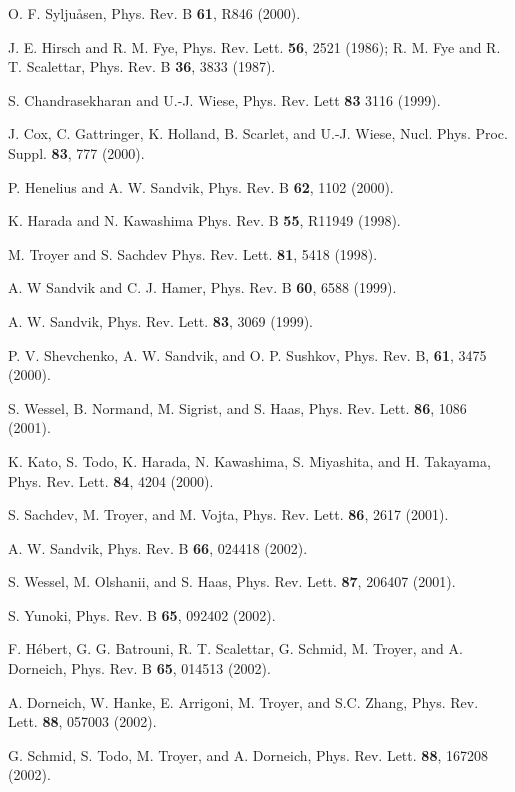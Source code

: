 \documentclass[10pt,pre,aps,twocolumn,showpacs,superscriptaddress,
floatfix]{revtex4}
\begin{document}
\begin{thebibliography}{00}
O. F. Sylju{\aa}sen, Phys. Rev. B {\bf 61}, R846 (2000).

J. E. Hirsch and R. M. Fye, Phys. Rev. Lett. {\bf 56}, 2521 (1986);
R. M. Fye and  R. T. Scalettar, Phys. Rev. B {\bf 36}, 3833 (1987).

S. Chandrasekharan and U.-J. Wiese, Phys. Rev. Lett {\bf 83} 3116 (1999).

J. Cox, C. Gattringer, K. Holland, B. Scarlet, and U.-J. Wiese,
Nucl. Phys. Proc. Suppl. {\bf 83}, 777 (2000).

P. Henelius and A. W. Sandvik, Phys. Rev. B {\bf 62}, 1102 (2000).

K. Harada and N. Kawashima Phys. Rev. B {\bf 55}, R11949 (1998).

M. Troyer and S. Sachdev Phys. Rev. Lett. {\bf 81}, 5418 (1998).

A. W Sandvik and C. J. Hamer, Phys. Rev. B {\bf 60}, 6588 (1999).

A. W. Sandvik, Phys. Rev. Lett. {\bf 83}, 3069 (1999).

P. V. Shevchenko, A. W. Sandvik, and O. P. Sushkov, Phys. Rev. B, {\bf 61}, 
3475 (2000).

S. Wessel, B. Normand, M. Sigrist, and S. Haas, Phys. Rev. Lett.
{\bf 86}, 1086 (2001).

K. Kato,  S. Todo, K. Harada, N. Kawashima, S. Miyashita, and H. Takayama,
Phys. Rev. Lett. {\bf 84}, 4204 (2000).

S. Sachdev, M. Troyer, and M. Vojta,  Phys. Rev. Lett. {\bf 86}, 2617 (2001).

A. W. Sandvik, Phys. Rev. B {\bf 66}, 024418 (2002).

S. Wessel, M. Olshanii, and S. Haas, Phys. Rev. Lett. {\bf 87},
206407 (2001).

S. Yunoki, Phys. Rev. B {\bf 65}, 092402 (2002).

F. H\'ebert, G. G. Batrouni, R. T. Scalettar, G. Schmid, M. Troyer,
and A. Dorneich, Phys. Rev. B {\bf 65}, 014513 (2002). 

A. Dorneich, W. Hanke, E. Arrigoni, M. Troyer, and S.C. Zhang,
Phys. Rev. Lett. {\bf 88}, 057003 (2002).

G. Schmid, S. Todo, M. Troyer, and A. Dorneich,
Phys. Rev. Lett. {\bf 88}, 167208 (2002).


\end{thebibliography}
\end{document}
